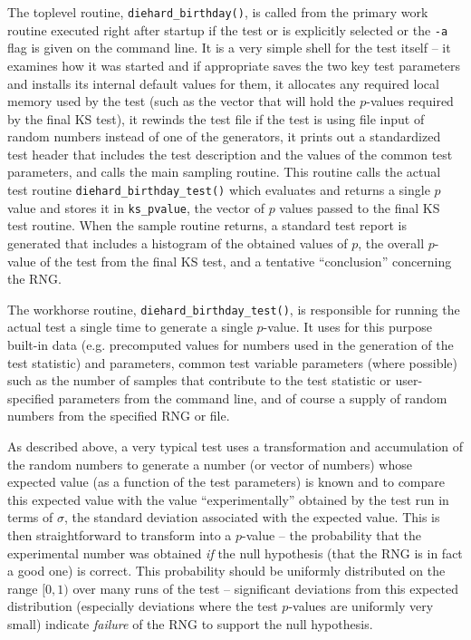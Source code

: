 \documentclass[12pt]{article}
\begin{document}
The toplevel routine, {\tt diehard\_birthday()}, is called from the
primary work routine executed right after startup if the test or is
explicitly selected or the {\tt -a} flag is given on the command line.
It is a very simple shell for the test itself -- it examines how it was
started and if appropriate saves the two key test parameters and
installs its internal default values for them, it allocates any required
local memory used by the test (such as the vector that will hold the
$p$-values required by the final KS test), it rewinds the test file if
the test is using file input of random numbers instead of one of the
generators, it prints out a standardized test header that includes the
test description and the values of the common test parameters, and
calls the main sampling routine.  This routine calls the actual test
routine {\tt diehard\_birthday\_test()} which evaluates and returns a
single $p$ value and stores it in {\tt ks\_pvalue}, the vector of $p$
values passed to the final KS test routine.  When the sample routine
returns, a standard test report is generated that includes a histogram
of the obtained values of $p$, the overall $p$-value of the test from
the final KS test, and a tentative ``conclusion'' concerning the RNG.

The workhorse routine, {\tt diehard\_birthday\_test()}, is responsible for
running the actual test a single time to generate a single $p$-value.
It uses for this purpose built-in data (e.g. precomputed values for
numbers used in the generation of the test statistic) and parameters,
common test variable parameters (where possible) such as the number of
samples that contribute to the test statistic or user-specified
parameters from the command line, and of course a supply of random
numbers from the specified RNG or file.  

As described above, a very typical test uses a transformation and
accumulation of the random numbers to generate a number (or vector of
numbers) whose expected value (as a function of the test parameters) is
known and to compare this expected value with the value
``experimentally'' obtained by the test run in terms of $\sigma$, the
standard deviation associated with the expected value.  This is then
straightforward to transform into a $p$-value -- the probability that
the experimental number was obtained {\em if} the null hypothesis (that
the RNG is in fact a good one) is correct.  This probability should be
uniformly distributed on the range $[0,1)$ over many runs of the test --
significant deviations from this expected distribution (especially
deviations where the test $p$-values are uniformly very small) indicate
{\em failure} of the RNG to support the null hypothesis.
\end{document}
